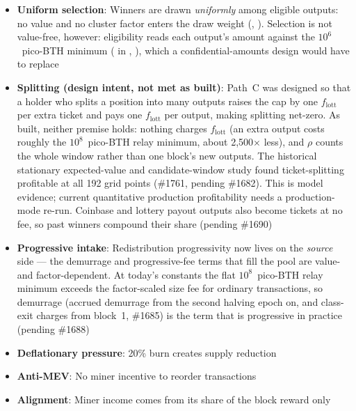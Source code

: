 \begin{itemize}
  \item \textbf{Uniform selection}: Winners are drawn \emph{uniformly}
    among eligible outputs: no value and no cluster factor enters the draw
    weight (,
    ). Selection is not value-free,
    however: eligibility reads each output's amount against the
    $10^{6}$~pico-BTH minimum ( in , ),
    which a confidential-amounts design would have to replace
  \item \textbf{Splitting (design intent, not met as built)}: Path~C was
    designed so that a holder who splits a position into many outputs raises
    the cap by one $f_{\text{lott}}$ per extra ticket and pays one
    $f_{\text{lott}}$ per output, making splitting net-zero. As built,
    neither premise holds: nothing charges $f_{\text{lott}}$ (an extra output
    costs roughly the $10^{8}$~pico-BTH relay minimum, about 2{,}500$\times$
    less), and $\rho$ counts the whole window rather than one block's new
    outputs. The historical stationary expected-value and candidate-window
    study found ticket-splitting profitable at all 192 grid points
    (\#1761, pending \#1682). This is model evidence; current quantitative
    production profitability needs a production-mode re-run.
    Coinbase and lottery payout outputs also become tickets at no fee, so
    past winners compound their share (pending \#1690)
  \item \textbf{Progressive intake}: Redistribution progressivity now lives
    on the \emph{source} side --- the demurrage and progressive-fee terms
    that fill the pool are value- and factor-dependent. At today's constants
    the flat $10^{8}$~pico-BTH relay minimum exceeds the factor-scaled size
    fee for ordinary transactions, so demurrage (accrued demurrage from the
    second halving epoch on, and class-exit charges from block~1, \#1685) is
    the term that is progressive in practice (pending \#1688)
  \item \textbf{Deflationary pressure}: 20\% burn creates supply reduction
  \item \textbf{Anti-MEV}: No miner incentive to reorder transactions
  \item \textbf{Alignment}: Miner income comes from its share of the block
    reward only
\end{itemize}

